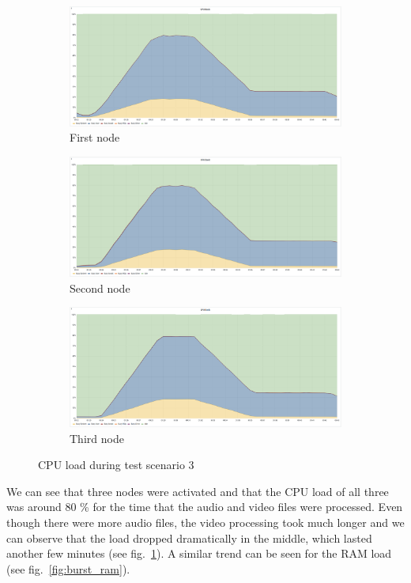 \begin{figure}[H]
    \begin{subfigure}[h]{0.5\linewidth}
        \centering
        \includegraphics[width=1\linewidth]{other-fig/tests/overload_cpu1.png}
        \caption{First node}
    \end{subfigure}
    \hfill
    \begin{subfigure}[h]{0.5\linewidth}
        \centering
        \includegraphics[width=1\linewidth]{other-fig/tests/overload_cpu2.png}
        \caption{Second node}
    \end{subfigure}
    \begin{subfigure}[h]{1\linewidth}
        \centering
        \includegraphics[width=0.5\linewidth]{other-fig/tests/overload_cpu3.png}
        \caption{Third node}
    \end{subfigure}
    \caption{CPU load during test scenario 3}
    \label{fig:burst_cpu}
\end{figure}

We can see that three nodes were activated and that the CPU load of all three was around 80 \% for the time that the audio and video files were processed. Even though there were more audio files, the video processing took much longer and we can observe that the load dropped dramatically in the middle, which lasted another few minutes (see fig.~\ref{fig:burst_cpu}). A similar trend can be seen for the RAM load (see fig.~\ref{fig:burst_ram}). 


